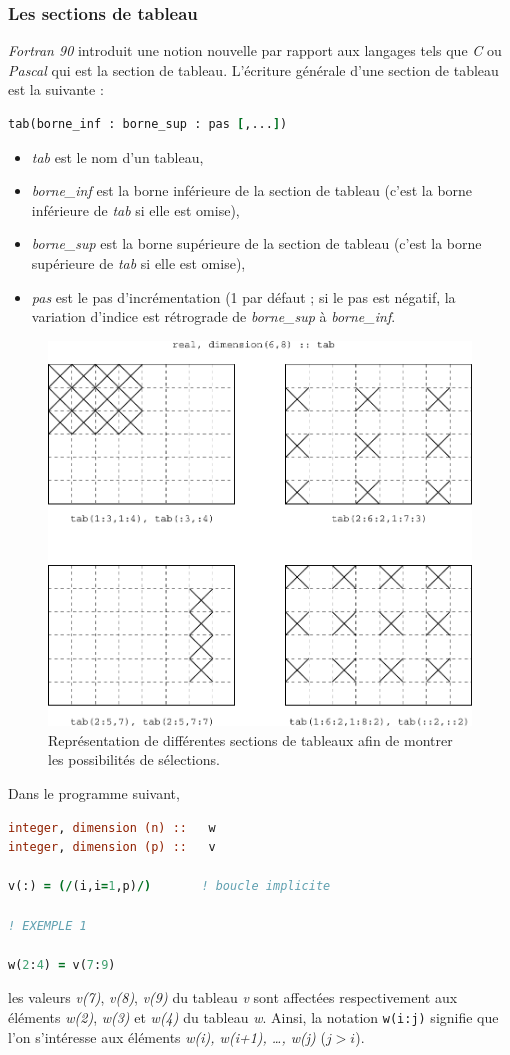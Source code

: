 \documentclass[a4paper,twoside]{article}
\begin{document}
\subsubsection{Les sections de tableau}

\emph{Fortran 90} introduit une notion nouvelle par rapport aux langages tels 
que \emph{C} ou \emph{Pascal} qui est la section de tableau. 
L'écriture générale d'une section de tableau est la suivante :
\begin{lstlisting}[language=Fortran]
tab(borne_inf : borne_sup : pas [,...])
\end{lstlisting}


\begin{itemize}
\item \emph{tab} est le nom d'un tableau,
\item \emph{borne\_inf} est la borne inférieure de la section de tableau (c'est la borne inférieure de \emph{tab} si elle est omise), 
\item \emph{borne\_sup} est la borne supérieure de la section de tableau (c'est la borne supérieure de \emph{tab} si elle est omise),
\item \emph{pas} est le pas d'incrémentation (1 par défaut ; si le pas est négatif, la variation d'indice est rétrograde de \emph{borne\_sup} à \emph{borne\_inf}.
\end{itemize}

\begin{figure}[htb]
\centering
\includegraphics[width=0.65\linewidth]{figure/sections_de_tableaux.pdf}
\caption{Représentation de différentes sections de tableaux afin de montrer les possibilités de sélections.}
\end{figure}

Dans le programme suivant,
\begin{lstlisting}[language=Fortran]
integer, dimension (n) ::   w
integer, dimension (p) ::   v

v(:) = (/(i,i=1,p)/)       ! boucle implicite

! EXEMPLE 1

w(2:4) = v(7:9)
\end{lstlisting}
les valeurs  \emph{v(7)}, \emph{v(8)}, \emph{v(9)} du tableau \emph{v} sont affectées respectivement aux éléments \emph{w(2)}, \emph{w(3)} et \emph{w(4)} du tableau \emph{w}. Ainsi, la notation \texttt{w(i:j)} signifie que l'on s'intéresse aux éléments \emph{w(i), w(i+1), \ldots, w(j)} ($j>i$). 
\end{document}

